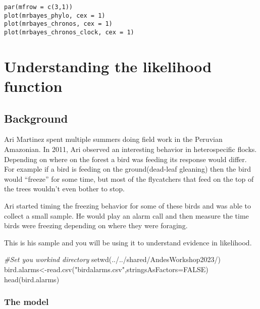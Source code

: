 \documentclass[
]{book}
\newenvironment{Shaded}{\begin{snugshade}}{\end{snugshade}}
\newcommand{\AttributeTok}[1]{\textcolor[rgb]{0.77,0.63,0.00}{#1}}
\newcommand{\CommentTok}[1]{\textcolor[rgb]{0.56,0.35,0.01}{\textit{#1}}}
\newcommand{\ConstantTok}[1]{\textcolor[rgb]{0.00,0.00,0.00}{#1}}
\newcommand{\FunctionTok}[1]{\textcolor[rgb]{0.00,0.00,0.00}{#1}}
\newcommand{\NormalTok}[1]{#1}
\newcommand{\OtherTok}[1]{\textcolor[rgb]{0.56,0.35,0.01}{#1}}
\newcommand{\StringTok}[1]{\textcolor[rgb]{0.31,0.60,0.02}{#1}}
\begin{document}
\begin{verbatim}
par(mfrow = c(3,1))
plot(mrbayes_phylo, cex = 1)
plot(mrbayes_chronos, cex = 1)
plot(mrbayes_chronos_clock, cex = 1)
\end{verbatim}

\hypertarget{understanding-the-likelihood-function}{%
\chapter{Understanding the likelihood function}\label{understanding-the-likelihood-function}}

\hypertarget{background-1}{%
\section{Background}\label{background-1}}

Ari Martinez spent multiple summers doing field work in the Peruvian Amazonian. In 2011, Ari observed an interesting behavior in heterospecific flocks. Depending on where on the forest a bird was feeding its response would differ. For example if a bird is feeding on the ground(dead-leaf gleaning) then the bird would ``freeze'' for some time, but most of the flycatchers that feed on the top of the trees wouldn't even bother to stop.

Ari started timing the freezing behavior for some of these birds and was able to collect a small sample. He would play an alarm call and then measure the time birds were freezing depending on where they were foraging.

This is his sample and you will be using it to understand evidence in likelihood.

\begin{Shaded}
\begin{Highlighting}[]
\CommentTok{\#Set you workind directory}
\FunctionTok{setwd}\NormalTok{(}\StringTok{\textquotesingle{}../../shared/AndesWorkshop2023/\textquotesingle{}}\NormalTok{)}
\NormalTok{bird.alarms}\OtherTok{\textless{}{-}}\FunctionTok{read.csv}\NormalTok{(}\StringTok{"birdalarms.csv"}\NormalTok{,}\AttributeTok{stringsAsFactors=}\ConstantTok{FALSE}\NormalTok{)}
\FunctionTok{head}\NormalTok{(bird.alarms)}
\end{Highlighting}
\end{Shaded}

\hypertarget{the-model}{%
\subsection{The model}\label{the-model}}
\end{document}
